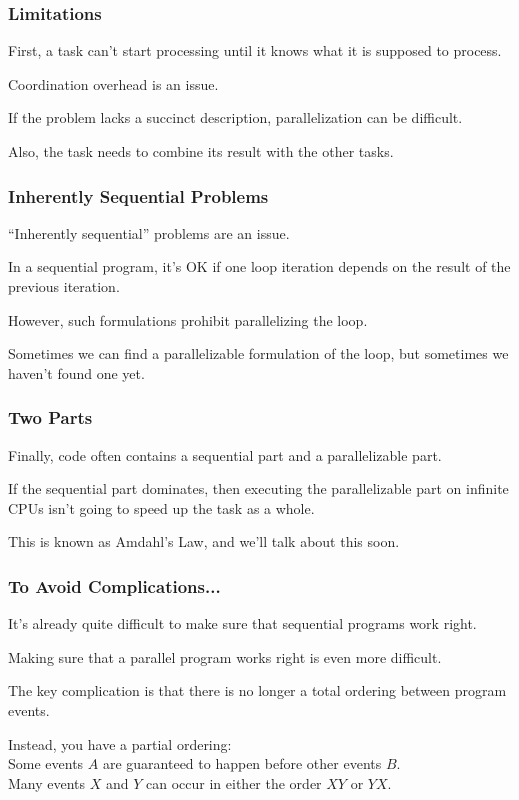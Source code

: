 \begin{frame}
\frametitle{Limitations}

First, a task can't start processing until it knows what it
is supposed to process. 

Coordination overhead is an issue. 

If the
problem lacks a succinct description, parallelization can be
difficult. 

Also, the task needs to combine its result with the other
tasks.

\end{frame}



\begin{frame}
\frametitle{Inherently Sequential Problems}

``Inherently sequential'' problems are an issue. 

In a sequential 
program, it's OK if one loop iteration depends on the result of the
previous iteration. 

However, such formulations prohibit parallelizing
the loop. 

Sometimes we can find a parallelizable formulation of the loop,
but sometimes we haven't found one yet.

\end{frame}




\begin{frame}
\frametitle{Two Parts}

Finally, code often contains a sequential part and a parallelizable
part.  

If the sequential part dominates, then
executing the parallelizable part on infinite CPUs isn't going to speed up the task as a whole. 

This is
known as Amdahl's Law, and we'll talk about this soon.


\end{frame}



\begin{frame}
\frametitle{To Avoid Complications...}

 It's already quite difficult to make sure that
sequential programs work right. 

Making sure that a parallel program
works right is even more difficult.

The key complication is that there is no longer a total ordering between
program events. 

Instead, you have a partial ordering:\\
\quad Some events $A$ are guaranteed to happen before other events $B$.\\
\quad Many events $X$  and $Y$ can occur in either the order $XY$ or $YX$.

\end{frame}




